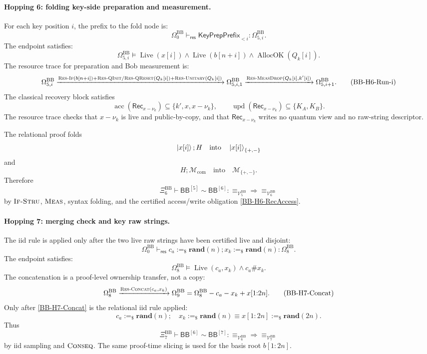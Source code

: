 \documentclass{report}
\theoremstyle{defn_style}
\providecommand{\Live}{\operatorname{Live}}
\providecommand{\AllocOK}{\operatorname{AllocOK}}
\providecommand{\acc}{\operatorname{acc}}
\providecommand{\upd}{\operatorname{upd}}
\providecommand{\HopBB}[1]{\mathsf{BB}^{[#1]}}
\begin{document}
\paragraph{Hopping 6: folding key-side preparation and measurement.}
For each key position \(i\), the prefix to the fold node is:
\[
\Omega^{\mathrm{BB}}_0
\vdash_{\mathsf{res}}
\mathsf{KeyPrepPrefix}_{<i}
:
\Omega^{\mathrm{BB}}_{5,i}.
\tag{BB-H6-Prefix-i}\label{BB-H6-Prefix-i}
\]
The endpoint satisfies:
\[
\Omega^{\mathrm{BB}}_{5,i}
\models
\Live(x[i])
\land
\Live(b[n+i])
\land
\AllocOK(Q_k[i]).
\tag{BB-H6-Req-i}
\]
The resource trace for preparation and Bob measurement is:
\[
\Omega^{\mathrm{BB}}_{5,i}
\xrightarrow{
\textsc{Res-If}(b[n+i])
+
\textsc{Res-QInit}/\textsc{Res-QReset}(Q_k[i])
+
\textsc{Res-Unitary}(Q_k[i])
}
\Omega^{\mathrm{BB}}_{5,i,1}
\xrightarrow{\textsc{Res-MeasDrop}(Q_k[i],k'[i])}
\Omega^{\mathrm{BB}}_{5,i+1}.
\tag{BB-H6-Run-i}
\]
The classical recovery block satisfies
\[
  \acc(\mathsf{Rec}_{x-\nu_k})
  \subseteq \{k',x,x-\nu_k\},
  \qquad
  \upd(\mathsf{Rec}_{x-\nu_k})
  \subseteq \{K_A,K_B\}.
\tag{BB-H6-RecAccess}\label{BB-H6-RecAccess}
\]
The resource trace checks that \(x-\nu_k\) is live and public-by-copy, and that
\(\mathsf{Rec}_{x-\nu_k}\) writes no quantum view and no raw-string descriptor.

The relational proof folds
\[
\ket{x[i]};H
\quad\text{into}\quad
\ket{x[i]}_{\{+,-\}}
\]
and
\[
H;\mathcal M_{\mathrm{com}}
\quad\text{into}\quad
\mathcal M_{\{+,-\}}.
\]
Therefore
\[
\Xi^{\mathrm{BB}}_6
\vdash
\HopBB{5}\sim\HopBB{6}:
\equiv_{\mathcal V^{\mathrm{BB}}_5}
\Longrightarrow
\equiv_{\mathcal V^{\mathrm{BB}}_6}
\tag{BB-H6-Rel}\label{BB-H6-Rel}
\]
by \(\textsc{If-Stru}\), \(\textsc{Meas}\), syntax folding, and the certified
access/write obligation \eqref{BB-H6-RecAccess}.

\paragraph{Hopping 7: merging check and key raw strings.}
The iid rule is applied only after the two live raw strings have been certified
live and disjoint:
\[
\Omega^{\mathrm{BB}}_0
\vdash_{\mathsf{res}}
c_a:=_\$\mathbf{rand}(n);
x_k:=_\$\mathbf{rand}(n)
:
\Omega^{\mathrm{BB}}_8.
\tag{BB-H7-Prefix}\label{BB-H7-Prefix}
\]
The endpoint satisfies:
\[
\Omega^{\mathrm{BB}}_8
\models
\Live(c_a,x_k)
\land
c_a\#x_k.
\tag{BB-H7-ConcatReq}
\]
The concatenation is a proof-level ownership transfer, not a copy:
\[
\Omega^{\mathrm{BB}}_8
\xrightarrow{\textsc{Res-Concat}(c_a,x_k)}
\Omega^{\mathrm{BB}}_9
=
\Omega^{\mathrm{BB}}_8-c_a-x_k+x[1{:}2n].
\tag{BB-H7-Concat}\label{BB-H7-Concat}
\]
Only after \eqref{BB-H7-Concat} is the relational iid rule applied:
\[
c_a:=_\$\mathbf{rand}(n);
\quad
x_k:=_\$\mathbf{rand}(n)
\equiv
x[1{:}2n]:=_\$\mathbf{rand}(2n).
\tag{BB-H7-IID}
\]
Thus
\[
\Xi^{\mathrm{BB}}_7
\vdash
\HopBB{6}\sim\HopBB{7}:
\equiv_{\mathcal V^{\mathrm{BB}}_6}
\Longrightarrow
\equiv_{\mathcal V^{\mathrm{BB}}_7}
\tag{BB-H7-Rel}\label{BB-H7-Rel}
\]
by iid sampling and \(\textsc{Conseq}\).  The same proof-time slicing is used
for the basis root \(b[1{:}2n]\).
\end{document}
